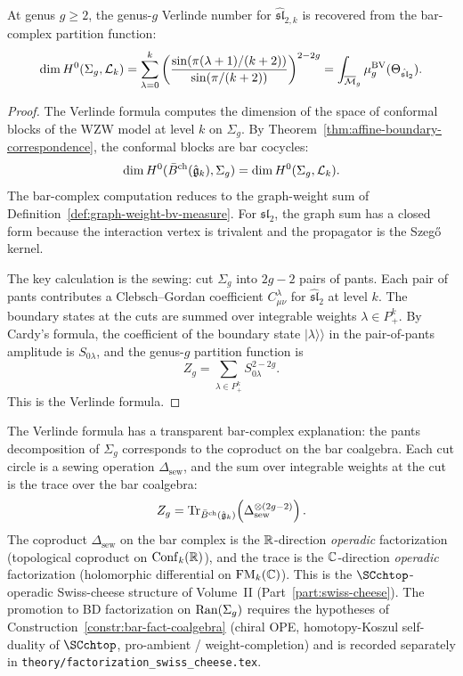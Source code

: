 \begin{theorem}
At genus $g \geq 2$, the genus-$g$ Verlinde number for $\hat{\mathfrak{sl}}_{2,k}$
is recovered from the bar-complex partition function:
\[
\dim H^0(\Sigma_g, \mathcal{L}_k)
 = \sum_{\lambda=0}^{k}
 \left(\frac{\sin(\pi(\lambda+1)/(k+2))}
 {\sin(\pi/(k+2))}\right)^{2-2g}
 = \int_{\overline{\mathcal{M}}_g} \mu^{\mathrm{BV}}_g(\Theta_{\hat{\mathfrak{sl}}_2}).
\]
\end{theorem}

\begin{proof}
The Verlinde formula computes the dimension of the space of conformal
blocks of the WZW model at level $k$ on $\Sigma_g$. By
Theorem~\ref{thm:affine-boundary-correspondence}, the conformal blocks
are bar cocycles:
\[
\dim H^0(\bar{B}^{\mathrm{ch}}(\hat{\mathfrak{g}}_k), \Sigma_g)
 = \dim H^0(\Sigma_g, \mathcal{L}_k).
\]
The bar-complex computation reduces to the graph-weight sum of
Definition~\ref{def:graph-weight-bv-measure}. For $\mathfrak{sl}_2$,
the graph sum has a closed form because the interaction vertex is
trivalent and the propagator is the Szeg\H{o} kernel.

The key calculation is the sewing: cut $\Sigma_g$ into $2g-2$ pairs of
pants. Each pair of pants contributes a Clebsch--Gordan coefficient
$C^\lambda_{\mu\nu}$ for $\widehat{\mathfrak{sl}}_2$ at level $k$.
The boundary states at the cuts are summed over integrable weights
$\lambda \in P^k_+$. By Cardy's formula, the coefficient of the
boundary state $|\lambda\rangle\!\rangle$ in the pair-of-pants amplitude
is $S_{0\lambda}$, and the genus-$g$ partition function is
\[
Z_g = \sum_{\lambda \in P^k_+} S_{0\lambda}^{2-2g}.
\]
This is the Verlinde formula.
\end{proof}

\begin{remark}
The Verlinde formula has a transparent bar-complex explanation: the
pants decomposition of $\Sigma_g$ corresponds to the coproduct on the
bar coalgebra. Each cut circle is a sewing operation
$\Delta_{\mathrm{sew}}$, and the sum over integrable weights at the cut
is the trace over the bar coalgebra:
\[
Z_g = \operatorname{Tr}_{\bar{B}^{\mathrm{ch}}(\hat{\mathfrak{g}}_k)}\!\left(
 \Delta_{\mathrm{sew}}^{\otimes (2g-2)}
\right).
\]
The coproduct $\Delta_{\mathrm{sew}}$ on the bar complex is the
$\mathbb{R}$-direction \emph{operadic} factorization (topological
coproduct on $\operatorname{Conf}_k(\mathbb{R})$), and the trace is the
$\mathbb{C}$-direction \emph{operadic} factorization (holomorphic
differential on $\operatorname{FM}_k(\mathbb{C})$). This is the $\SCchtop$-operadic
Swiss-cheese structure of Volume~II
(Part~\ref{part:swiss-cheese}). The promotion to BD
factorization on $\operatorname{Ran}(\Sigma_g)$ requires the hypotheses of
Construction~\ref{constr:bar-fact-coalgebra}
\textup{(}chiral OPE, homotopy-Koszul self-duality of
$\SCchtop$, pro-ambient / weight-completion\textup{)} and is
recorded separately in
\texttt{theory/factorization\_swiss\_cheese.tex}.
\end{remark}

